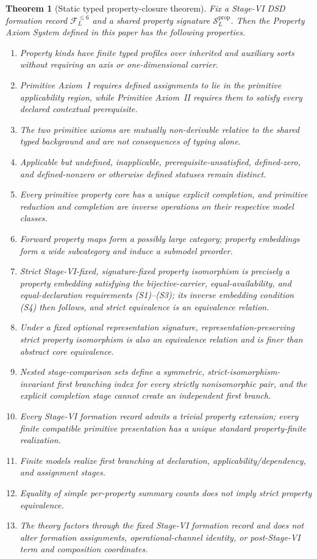 \documentclass[11pt]{article}
\newcommand{\FVI}{\mathcal F_{L}^{\le 6}}
\newcommand{\Sprop}{\mathcal S_{L}^{\mathrm{prop}}}
\newtheorem{theorem}{Theorem}[section]
\theoremstyle{definition}
\theoremstyle{remark}
\begin{document}
\begin{theorem}[Static typed property-closure theorem]
\label{thm:main}
Fix a Stage-VI DSD formation record \(\FVI\) and a shared property signature \(\Sprop\).
Then the Property Axiom System defined in this paper has the following properties.
\begin{enumerate}[label=(\arabic*)]
\item Property kinds have finite typed profiles over inherited and auxiliary sorts without requiring an axis or one-dimensional carrier.
\item Primitive Axiom~I requires defined assignments to lie in the primitive applicability region, while Primitive Axiom~II requires them to satisfy every declared contextual prerequisite.
\item The two primitive axioms are mutually non-derivable relative to the shared typed background and are not consequences of typing alone.
\item Applicable but undefined, inapplicable, prerequisite-unsatisfied, defined-zero, and defined-nonzero or otherwise defined statuses remain distinct.
\item Every primitive property core has a unique explicit completion, and primitive reduction and completion are inverse operations on their respective model classes.
\item Forward property maps form a possibly large category; property embeddings form a wide subcategory and induce a submodel preorder.
\item Strict Stage-VI-fixed, signature-fixed property isomorphism is precisely a property embedding satisfying the bijective-carrier, equal-availability, and equal-declaration requirements (S1)--(S3); its inverse embedding condition (S4) then follows, and strict equivalence is an equivalence relation.
\item Under a fixed optional representation signature, representation-preserving strict property isomorphism is also an equivalence relation and is finer than abstract core equivalence.
\item Nested stage-comparison sets define a symmetric, strict-isomorphism-invariant first branching index for every strictly nonisomorphic pair, and the explicit completion stage cannot create an independent first branch.
\item Every Stage-VI formation record admits a trivial property extension; every finite compatible primitive presentation has a unique standard property-finite realization.
\item Finite models realize first branching at declaration, applicability/dependency, and assignment stages.
\item Equality of simple per-property summary counts does not imply strict property equivalence.
\item The theory factors through the fixed Stage-VI formation record and does not alter formation assignments, operational-channel identity, or post-Stage-VI term and composition coordinates.
\end{enumerate}
\end{theorem}
\end{document}
